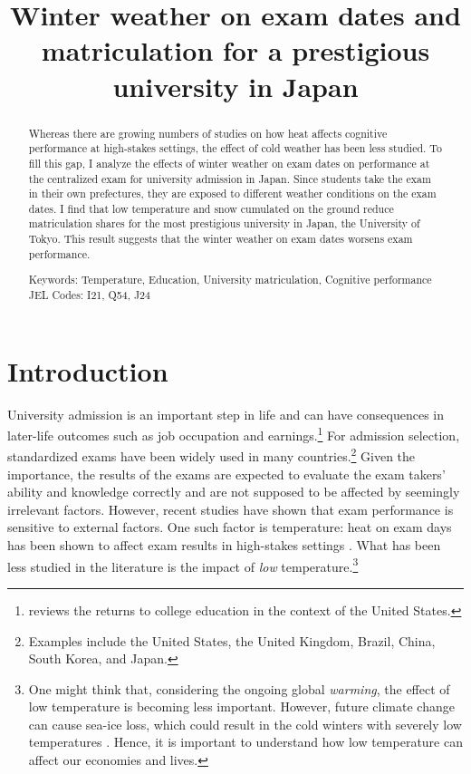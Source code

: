 \documentclass[12pt,letterpaper]{article}
\title{Winter weather on exam dates and matriculation for a prestigious university in Japan}
\date{}
\begin{document}
  
\maketitle
\begin{abstract}
  \singlespacing
    \noindent 
    Whereas there are growing numbers of studies on how heat affects cognitive performance at high-stakes settings, the effect of cold weather has been less studied.
    To fill this gap, I analyze the effects of winter weather on exam dates on performance at the centralized exam for university admission in Japan.
    Since students take the exam in their own prefectures, they are exposed to different weather conditions on the exam dates. 
    I find that low temperature and snow cumulated on the ground reduce matriculation shares for the most prestigious university in Japan, the University of Tokyo.
    This result suggests that the winter weather on exam dates worsens exam performance. 

  \medskip
  \vspace{1cm}
  \noindent Keywords: Temperature, Education, University matriculation, Cognitive performance
  \vspace{1cm}
  JEL Codes: I21, Q54, J24
\end{abstract}

\newpage

\section{Introduction}

University admission is an important step in life and can have consequences in later-life outcomes such as job occupation and earnings.\footnote{
  \citet{Hout2012} reviews the returns to college education in the context of the United States.
}
For admission selection, standardized exams have been widely used in many countries.\footnote{
  Examples include the United States, the United Kingdom, Brazil, China, South Korea, and Japan.
}
Given the importance, the results of the exams are expected to evaluate the exam takers' ability and knowledge correctly and are not supposed to be affected by seemingly irrelevant factors.
However, recent studies have shown that exam performance is sensitive to external factors.
One such factor is temperature:
heat on exam days has been shown to affect exam results in high-stakes settings \citep{Park2020a, GraffZivin2020, Melo2019}.
What has been less studied in the literature is the impact of \textit{low} temperature.\footnote{
  One might think that, considering the ongoing global \textit{warming}, the effect of low temperature is becoming less important.
  However, future climate change can cause sea-ice loss, which could result in the cold winters with severely low temperatures \citep{Kretschmer2016, Kim2014}.
  Hence, it is important to understand how low temperature can affect our economies and lives.
}
\end{document}
